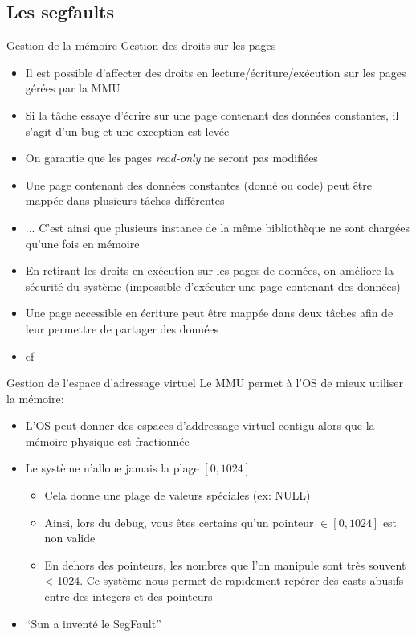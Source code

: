 \subsection{Les segfaults}

\begin{frame}{Gestion de la mémoire}
  Gestion des droits sur les pages
  \begin{itemize}
  \item    Il    est     possible    d'affecter    des    droits    en
    lecture/écriture/exécution sur les pages gérées par la MMU
  \item Si la tâche essaye d'écrire sur une page contenant des données
    constantes, il s'agit d'un bug et une exception est levée
  \item  On garantie  que  les pages  \emph{read-only}  ne seront  pas
    modifiées
  \item Une page contenant des données constantes (donné ou code) peut
    être mappée dans plusieurs tâches différentes
  \item ... C'est ainsi que plusieurs instance de la même bibliothèque
    ne sont chargées qu'une fois en mémoire
  \item En retirant les droits  en exécution sur les pages de données,
    on améliore la sécurité du système (impossible d'exécuter une page
    contenant des données)
  \item Une  page accessible  en écriture peut  être mappée  dans deux
    tâches afin de leur permettre de partager des données
  \item cf 
  \end{itemize}
\end{frame}

\begin{frame}{Gestion de l'espace d'adressage virtuel}
  Le MMU permet à l'OS de mieux utiliser la mémoire:
  \begin{itemize}
  \item  L'OS peut  donner  des espaces  d'addressage virtuel  contigu
    alors que la mémoire physique est fractionnée
  \item Le système n'alloue jamais la plage $[0, 1024]$
    \begin{itemize}
    \item Cela donne une plage de valeurs spéciales (ex: NULL)
    \item Ainsi, lors du debug, vous êtes certains qu'un pointeur $\in
      [0, 1024]$ est non valide
    \item En dehors des pointeurs,  les nombres que l'on manipule sont
      très  souvent <  1024.   Ce système  nous  permet de  rapidement
      repérer des casts abusifs entre des integers et des pointeurs
    \end{itemize}
  \item ``Sun a inventé le SegFault''
  \end{itemize}
\end{frame}

